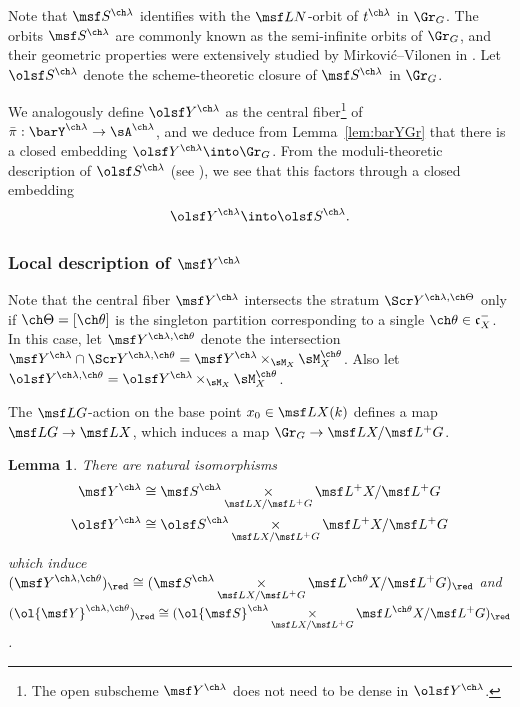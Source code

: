 \documentclass[final]{amsart}
\newtheorem{lem}[subsubsection]{Lemma}
\theoremstyle{remark}
\theoremstyle{definition}
\DeclareMathOperator*{\xt}{\times}
\numberwithin{equation}{section}
\begin{document}
Note that $\msf S^{\ch\lambda}$ identifies with 
the $\msf L N$-orbit of $t^{\ch\lambda}$ in $\Gr_G$. 
The orbits $\msf S^{\ch\lambda}$ are commonly known
as the semi-infinite orbits of $\Gr_G$, and their geometric properties
were extensively studied by Mirkovi\'c--Vilonen in \cite{MV}. 
Let $\olsf S^{\ch\lambda}$ denote the scheme-theoretic closure 
of $\msf S^{\ch\lambda}$ in $\Gr_G$.

We analogously define $\olsf Y^{\ch\lambda}$ as the central fiber\footnote{The open subscheme $\msf Y^{\ch\lambda}$ does not need to be dense in $\olsf Y^{\ch\lambda}$.}
of $\bar\pi : \barY^{\ch\lambda} \to \sA^{\ch\lambda}$, and 
we deduce from Lemma~\ref{lem:barYGr} that there is a 
closed embedding $\olsf Y^{\ch\lambda} \into \Gr_G$. 
From the moduli-theoretic description of $\olsf S^{\ch\lambda}$ 
(see \cite[proof of Proposition 5.3.6]{Xinwen}), we see that
this factors through a closed embedding 
\begin{equation} \label{e:olYembedGr}
    \olsf Y^{\ch\lambda} \into \olsf S^{\ch\lambda}.
\end{equation}

\subsubsection{Local description of $\msf Y^{\ch\lambda}$} 
Note that the central fiber $\msf Y^{\ch\lambda}$
intersects the stratum $\Scr Y^{\ch\lambda,\ch\Theta}$ 
only if $\ch\Theta =[\ch\theta]$ is the singleton partition corresponding to 
a single $\ch\theta \in \mathfrak c_X^-$. 
In this case, let $\msf Y^{\ch\lambda,\ch\theta}$ denote
the intersection $\msf Y^{\ch\lambda} \cap \Scr Y^{\ch\lambda,\ch\theta} = \msf Y^{\ch\lambda}
\xt_{\sM_X} \sM_X^{\ch\theta}$.
Also let $\olsf Y^{\ch\lambda,\ch\theta} = \olsf Y^{\ch\lambda} \xt_{\sM_X} \sM_X^{\ch\theta}$.

The $\msf L G$-action on the base point $x_0 \in \msf L X(k)$
defines a map $\msf L G \to \msf L X$, which induces a map 
$\Gr_G \to \msf L X/ \msf L^+G$.  

\begin{lem} \label{lem:Y=ScapGr}
There are natural isomorphisms
\begin{align} 
    \msf Y^{\ch\lambda} & 
        \cong \msf S^{\ch\lambda} \xt_{\msf L X/\msf L^+G} \msf L^+ X/\msf L^+G 
\label{e:YScapGr} \\
    \olsf Y^{\ch\lambda} & 
        \cong \olsf S^{\ch\lambda} \xt_{\msf L X/\msf L^+G} \msf L^+ X / \msf L^+G 
\label{e:olYScapGr}
\end{align}
which induce 
$\displaystyle (\msf Y^{\ch\lambda,\ch\theta})_\red \cong (\msf S^{\ch\lambda} \xt_{\msf L X/\msf L^+G} \msf L^{\ch\theta}X/\msf L^+G)_\red$ 
and 
$\displaystyle (\ol{\msf Y}^{\ch\lambda,\ch\theta})_\red \cong (\ol{\msf S}^{\ch\lambda}
 \xt_{\msf L X/\msf L^+G} \msf L^{\ch\theta}X/\msf L^+G)_\red$.
\end{lem}
\end{document}
